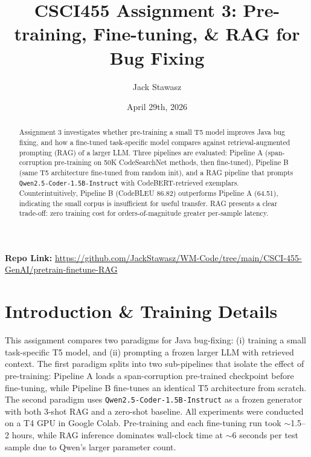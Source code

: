 \documentclass[letterpaper,12pt]{article}
\begin{document}
\title{CSCI455 Assignment 3: Pre-training, Fine-tuning, \& RAG for Bug Fixing \-\vspace{-0.7cm}}
\author{Jack Stawasz}
\date{\vspace{-0.35cm} April 29th, 2026}
\maketitle

\vspace{-0.5cm}
\textbf{Repo Link:} \href{https://github.com/JackStawasz/WM-Code/tree/main/CSCI-455-GenAI/pretrain-finetune-RAG}{https://github.com/JackStawasz/WM-Code/tree/main/CSCI-455-GenAI/pretrain-finetune-RAG}
\vspace{0.5cm}

\-\vspace{-1.1cm}
\begin{abstract}
Assignment 3 investigates whether pre-training a small T5 model improves Java bug fixing, and how a fine-tuned task-specific model compares against retrieval-augmented prompting (RAG) of a larger LLM. Three pipelines are evaluated: Pipeline A (span-corruption pre-training on 50K CodeSearchNet methods, then fine-tuned), Pipeline B (same T5 architecture fine-tuned from random init), and a RAG pipeline that prompts \texttt{Qwen2.5-Coder-1.5B-Instruct} with CodeBERT-retrieved exemplars. Counterintuitively, Pipeline B (CodeBLEU 86.82) outperforms Pipeline A (64.51), indicating the small corpus is insufficient for useful transfer. RAG presents a clear trade-off: zero training cost for orders-of-magnitude greater per-sample latency.
\end{abstract}


\vspace{-0.6cm}
\section{Introduction \& Training Details}

This assignment compares two paradigms for Java bug-fixing: (i) training a small task-specific T5 model, and (ii) prompting a frozen larger LLM with retrieved context. The first paradigm splits into two sub-pipelines that isolate the effect of pre-training: Pipeline A loads a span-corruption pre-trained checkpoint before fine-tuning, while Pipeline B fine-tunes an identical T5 architecture from scratch. The second paradigm uses \texttt{Qwen2.5-Coder-1.5B-Instruct} as a frozen generator with both 3-shot RAG and a zero-shot baseline. All experiments were conducted on a T4 GPU in Google Colab. Pre-training and each fine-tuning run took $\sim$1.5--2 hours, while RAG inference dominates wall-clock time at $\sim$6 seconds per test sample due to Qwen's larger parameter count.
\end{document}
